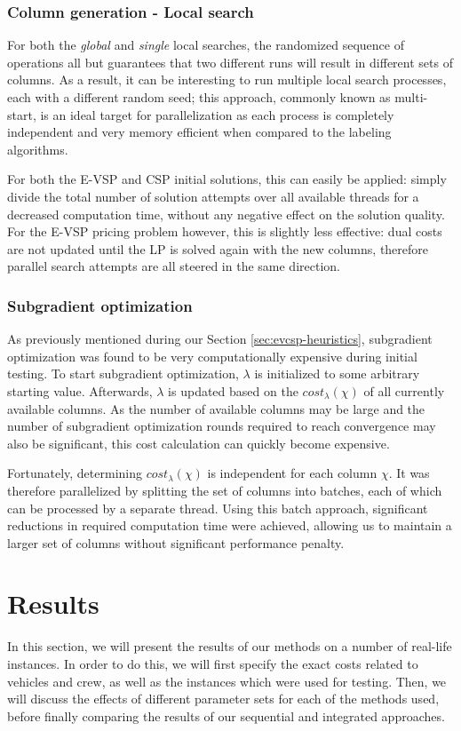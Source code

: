 \documentclass[]{article}
\begin{document}
\subsubsection{Column generation - Local search}
For both the \emph{global} and \emph{single} local searches, the randomized sequence of operations all but guarantees that two different runs will result in different sets of columns. As a result, it can be interesting to run multiple local search processes, each with a different random seed; this approach, commonly known as multi-start, is an ideal target for parallelization as each process is completely independent and very memory efficient when compared to the labeling algorithms. 

For both the E-VSP and CSP initial solutions, this can easily be applied: simply divide the total number of solution attempts over all available threads for a decreased computation time, without any negative effect on the solution quality. For the E-VSP pricing problem however, this is slightly less effective: dual costs are not updated until the LP is solved again with the new columns, therefore parallel search attempts are all steered in the same direction.

\subsubsection{Subgradient optimization}
As previously mentioned during our Section \ref{sec:evcsp-heuristics}, subgradient optimization was found to be very computationally expensive during initial testing. To start subgradient optimization, $\lambda$ is initialized to some arbitrary starting value. Afterwards, $\lambda$ is updated based on the $cost_\lambda(\chi)$ of all currently available columns. As the number of available columns may be large and the number of subgradient optimization rounds required to reach convergence may also be significant, this cost calculation can quickly become expensive.

Fortunately, determining $cost_\lambda(\chi)$ is independent for each column $\chi$. It was therefore parallelized by splitting the set of columns into batches, each of which can be processed by a separate thread. Using this batch approach, significant reductions in required computation time were achieved, allowing us to maintain a larger set of columns without significant performance penalty.

\section{Results}
In this section, we will present the results of our methods on a number of real-life instances. In order to do this, we will first specify the exact costs related to vehicles and crew, as well as the instances which were used for testing. Then, we will discuss the effects of different parameter sets for each of the methods used, before finally comparing the results of our sequential and integrated approaches.
\end{document}

